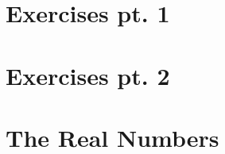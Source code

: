\documentclass[12pt, oneside]{book}
\begin{document}




	




\chapter*{Exercises pt. 1} \label{ex 1}
\vspace*{-0.25in}


\chapter*{Exercises pt. 2} \label{ex 2}
\vspace*{-0.25in}


\chapter{The Real Numbers} \label{Real nums}
\vspace*{-0.25in}


% 

% 

% 
\end{document}
